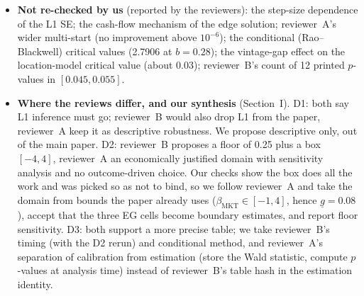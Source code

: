 \documentclass[11pt]{article}
\begin{document}
\begin{itemize}
\item \textbf{Not re-checked by us} (reported by the reviewers): the step-size dependence of the L1 SE; the cash-flow mechanism of the edge solution; reviewer~A's wider multi-start (no improvement above $10^{-6}$); the conditional (Rao--Blackwell) critical values (2.7906 at $b=0.28$); the vintage-gap effect on the location-model critical value (about 0.03); reviewer~B's count of 12 printed $p$-values in $[0.045,0.055]$.
\item \textbf{Where the reviews differ, and our synthesis} (Section~I). D1: both say L1 inference must go; reviewer~B would also drop L1 from the paper, reviewer~A keep it as descriptive robustness. We propose descriptive only, out of the main paper. D2: reviewer~B proposes a floor of 0.25 plus a box $[-4,4]$, reviewer~A an economically justified domain with sensitivity analysis and no outcome-driven choice. Our checks show the box does all the work and was picked so as not to bind, so we follow reviewer~A and take the domain from bounds the paper already uses ($\beta_{\mathrm{MKT}}\in[-1,4]$, hence $\underline g=0.08$), accept that the three EG cells become boundary estimates, and report floor sensitivity. D3: both support a more precise table; we take reviewer~B's timing (with the D2 rerun) and conditional method, and reviewer~A's separation of calibration from estimation (store the Wald statistic, compute $p$-values at analysis time) instead of reviewer~B's table hash in the estimation identity.
\end{itemize}
\end{document}
